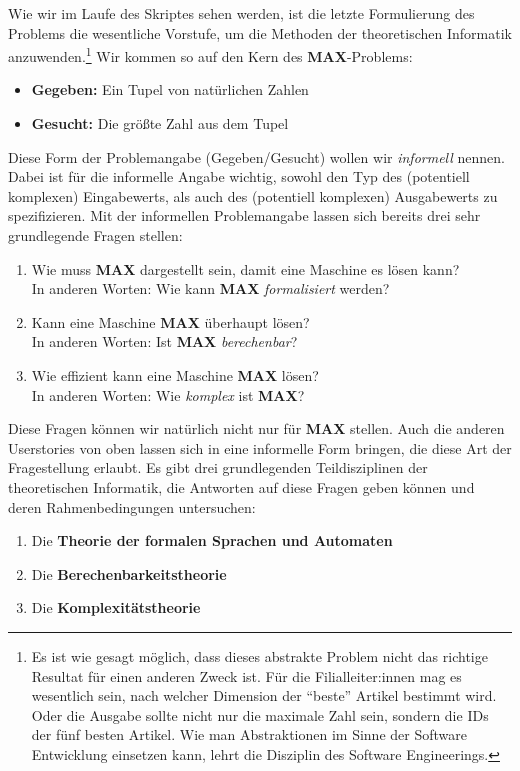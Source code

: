Wie wir im Laufe des Skriptes sehen werden, ist die letzte Formulierung des Problems die 
wesentliche Vorstufe, um die Methoden der theoretischen Informatik anzuwenden.\footnote{
Es ist wie gesagt möglich,
dass dieses abstrakte Problem nicht das richtige Resultat für einen anderen Zweck ist.
Für die Filialleiter:innen mag es wesentlich sein,
nach welcher Dimension der ``beste'' Artikel bestimmt wird.
Oder die Ausgabe sollte nicht nur die maximale Zahl sein, sondern die IDs der
fünf besten Artikel.
Wie man Abstraktionen im Sinne der Software Entwicklung einsetzen kann,
lehrt die Disziplin des Software Engineerings.}
Wir kommen so auf den Kern des \textbf{MAX}-Problems:
\begin{itemize}
    \item \textbf{Gegeben:} Ein Tupel von natürlichen Zahlen
    \item \textbf{Gesucht:} Die größte Zahl aus dem Tupel
\end{itemize}
Diese Form der Problemangabe (Gegeben/Gesucht) wollen wir \emph{informell} nennen.
Dabei ist für die informelle Angabe wichtig,
sowohl den Typ des (potentiell komplexen) Eingabewerts,
als auch des (potentiell komplexen) Ausgabewerts zu spezifizieren.
Mit der informellen Problemangabe lassen sich bereits drei sehr grundlegende Fragen stellen:
\begin{enumerate}
    \item Wie muss \textbf{MAX} dargestellt sein, damit eine Maschine es lösen kann?\\ 
        In anderen Worten: Wie kann \textbf{MAX} \emph{formalisiert} werden? 
    \item Kann eine Maschine \textbf{MAX} überhaupt lösen?\\
        In anderen Worten: Ist \textbf{MAX} \emph{berechenbar}?  
    \item Wie effizient kann eine Maschine \textbf{MAX} lösen?\\
        In anderen Worten: Wie \emph{komplex} ist \textbf{MAX}?
\end{enumerate}
Diese Fragen können wir natürlich nicht nur für \textbf{MAX} stellen.
Auch die anderen Userstories von oben lassen sich in eine informelle Form bringen,
die diese Art der Fragestellung erlaubt.
Es gibt drei grundlegenden Teildisziplinen der theoretischen Informatik,
die Antworten auf diese Fragen geben können und deren Rahmenbedingungen untersuchen:
\begin{enumerate}
    \item Die \textbf{Theorie der formalen Sprachen und Automaten}
    \item Die \textbf{Berechenbarkeitstheorie}
    \item Die \textbf{Komplexitätstheorie}
\end{enumerate}

